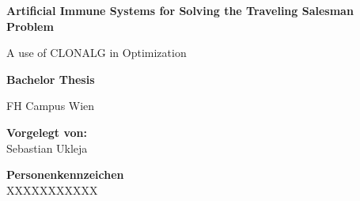 \begin{center}

\vspace{1.3cm}

\hspace*{-1.0cm} {\Large \textbf{Artificial Immune Systems for Solving the Traveling Salesman Problem\\}}

\hspace*{-1.0cm} A use of CLONALG in Optimization \\

\vspace{2.2cm}

\hspace*{-1.0cm} \textbf{Bachelor Thesis\\}

\vspace{0.65cm}

\hspace*{-1.0cm} FH Campus Wien \\





\vspace{5cm}

\hspace*{-1.0cm} \textbf{Vorgelegt von:} \\
\hspace*{-1.0cm} Sebastian Ukleja \\

\vspace{0.65cm}

\hspace*{-1.0cm} \textbf{Personenkennzeichen}\\
\hspace*{-1.0cm} XXXXXXXXXXX \\



\end{center}
